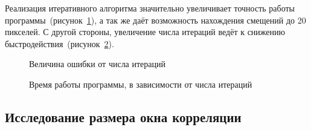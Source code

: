 Реализация итеративного алгоритма значительно увеличивает точность работы программы~(рисунок~\ref{pic:inter_err}), а так же даёт возможность нахождения смещений до 20 пикселей. С другой стороны, увеличение числа итераций ведёт к снижению быстродействия~(рисунок~\ref{pic:iter_time}).
\begin{figure}[h!]
\caption{Величина ошибки от числа итераций}
\label{pic:inter_err}
\end{figure}

\begin{figure}[h!]
\caption{Время работы программы, в зависимости от числа итераций}
\label{pic:iter_time}
\end{figure}
\subsection{Исследование размера окна корреляции}

